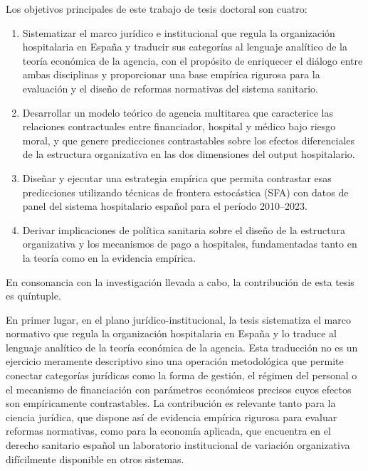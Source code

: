 Los objetivos principales de este trabajo de tesis doctoral son cuatro:

\begin{enumerate}[label=(\roman*)]
  \item Sistematizar el marco jurídico e institucional que regula 
la organización hospitalaria en España y traducir sus categorías 
al lenguaje analítico de la teoría económica de la agencia, 
con el propósito de enriquecer el diálogo entre ambas disciplinas 
y proporcionar una base empírica rigurosa para la evaluación 
y el diseño de reformas normativas del sistema sanitario.
  
  \item Desarrollar un modelo teórico de agencia multitarea que caracterice las relaciones contractuales entre financiador, hospital y médico bajo riesgo moral, y que genere predicciones contrastables sobre los efectos diferenciales de la estructura organizativa en las dos dimensiones del output hospitalario.

  \item Diseñar y ejecutar una estrategia empírica que permita contrastar esas predicciones utilizando técnicas de frontera estocástica (SFA) con datos de panel del sistema hospitalario español para el período 2010--2023.

  \item Derivar implicaciones de política sanitaria sobre el diseño de la estructura organizativa y los mecanismos de pago a hospitales, fundamentadas tanto en la teoría como en la evidencia empírica.
\end{enumerate}

En consonancia con la investigación llevada a cabo, la contribución de esta tesis es quíntuple.

En primer lugar, en el plano jurídico-institucional, la tesis 
sistematiza el marco normativo que regula la organización 
hospitalaria en España y lo traduce al lenguaje analítico de 
la teoría económica de la agencia. Esta traducción no es un 
ejercicio meramente descriptivo sino una operación metodológica 
que permite conectar categorías jurídicas como la forma de 
gestión, el régimen del personal o el mecanismo de financiación 
con parámetros económicos precisos cuyos efectos son 
empíricamente contrastables. La contribución es relevante 
tanto para la ciencia jurídica, que dispone así de evidencia 
empírica rigurosa para evaluar reformas normativas, como para 
la economía aplicada, que encuentra en el derecho sanitario 
español un laboratorio institucional de variación organizativa 
difícilmente disponible en otros sistemas.

